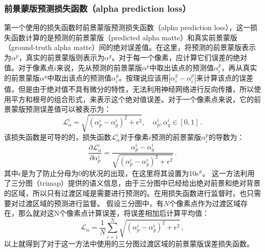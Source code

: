 \documentclass[supercite]{HustGraduPaper}
\begin{document}
    \subsubsection{前景蒙版预测损失函数（alpha prediction loss）}
    第一个使用的损失函数时前景蒙版预测损失函数（alpha prediction loss），这一损失函数计算的是预测的前景蒙版（predicted alpha matte）和真实前景蒙版（ground-truth alpha matte）间的绝对误差值。在这里，将预测的前景蒙版表示为$\alpha^p$，真实的前景蒙版则表示为$\alpha^g$。对于每一个像素，应计算它们误差的绝对值。对于像素点$i$来说，先从预测的前景蒙版$\alpha^p$中取出该点的预测值$\alpha^p_i$，再从真实的前景蒙版$\alpha^g$中取出该点的预测值$\alpha^g_i$。按理说应该用$|\alpha^g_i-\alpha^p_i|$来计算该点的误差值，但是由于绝对值不具有微分的特性，无法利用神经网络进行反向传播，所以使用平方和根号的组合形式，来表示这个绝对值误差。对于一个像素点来说，它的前景蒙版预测误差值可以被表示为：
    \begin{equation}
        \mathcal{L}_{\alpha}^{i}=\sqrt{\left(\alpha_{p}^{i}-\alpha_{g}^{i}\right)^{2}+\epsilon^{2}}, \quad \alpha_{p}^{i}, \alpha_{g}^{i} \in[0,1]\,.
    \end{equation}
    该损失函数是可导的的，损失函数$\mathcal{L}_{\alpha}^{i}$对于像素$i$预测的前景蒙版$\alpha^p_i$的导数为：
    \begin{equation}
        \frac{\partial{\mathcal{L}^i_{\alpha}}}{\partial{\alpha^i_{p}}}=\frac{\alpha_{p}^{i}-\alpha_{g}^{i}}{\sqrt{\left(\alpha_{p}^{i}-\alpha_{g}^{i}\right)^{2}+\epsilon^{2}}}\,.
    \end{equation}
    其中$\epsilon$是为了防止分母为$0$的状况的出现，在这里将其设置为$10e^{6}$。
    这一方法利用了三分图（trimap）提供的语义信息，由于三分图中已经给出绝对前景和绝对背景的区域，所以只有过渡区域是需要进行预测的。在用损失函数进行监督时，也只需要对过渡区域的预测进行监督。
    假设三分图中，有$N$个像素点作为过渡区域存在，那么就对这N个像素点计算误差，将误差相加后计算平均值：
    \begin{equation}
        \mathcal{L}_{\alpha}=\frac{1}{N}\sum_{i=1}^{N} \sqrt{\left(\alpha_{p}^{i}-\alpha_{g}^{i}\right)^{2}+\epsilon^{2}}\,,
    \end{equation}
    以上就得到了对于这一方法中使用的三分图过渡区域的前景蒙版误差损失函数。
\end{document}
